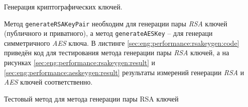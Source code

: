 \subsubsection{} Генерация криптографических ключей.
\label{sec:eng:performance:rsakeygen}

Метод \texttt{generateRSAKeyPair} необходим для генерации пары \textit{RSA} ключей (публичного и приватного), а метод \texttt{generateAESKey} -- для генераци симметричного \textit{AES} ключа. В листинге \ref{sec:eng:performance:rsakeygen:code} приведён код для тестирования метода генерации пары \textit{RSA} ключей, а на рисунках \ref{sec:eng:performance:rsakeygen:result} и \ref{sec:eng:performance:aeskeygen:result} результаты измерений генерации \textit{RSA} и \textit{AES} ключей соответственно.

\begin{code}
  
   \caption{Тестовый метод для метода генерации пары RSA ключей}
   \label{sec:eng:performance:rsakeygen:code}
\end{code}

